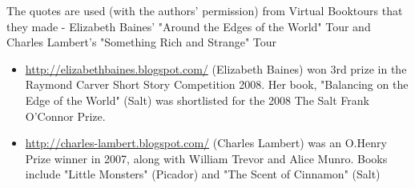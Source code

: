 \documentclass[11pt]{article}
\begin{document}
The quotes are used (with the authors' permission) from Virtual Booktours that they made - Elizabeth Baines' "Around the Edges of the World" Tour and Charles Lambert's "Something Rich and Strange" Tour


\begin{itemize}
\item \url{http://elizabethbaines.blogspot.com/} (Elizabeth Baines) won 3rd prize in the Raymond Carver Short Story Competition 2008. Her book, "Balancing on the Edge of the World" (Salt) was shortlisted for the 2008 The Salt Frank O'Connor Prize.
\item \url{http://charles-lambert.blogspot.com/} (Charles Lambert) was an O.Henry Prize winner in 2007, along with William
  Trevor and Alice Munro. Books include "Little Monsters" (Picador) and "The
  Scent of Cinnamon" (Salt)
\end{itemize}
\end{document}
